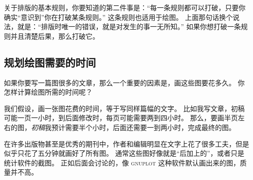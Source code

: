 关于排版的基本规则，你要知道的第二件事是：“每一条规则都可以打破，只要你确实“意识到”你在打破某条规则。”
这条规则也适用于绘图。
上面那句话换个说法，就是：“排版时唯一的错误，就是对发生的事一无所知。”
如果你想打破一条规则并且清楚后果，那么打破它。

\eohs


\subsection{规划绘图需要的时间}

\bohs

如果你要写一篇图很多的文章，那么一个重要的因素是，画这些图要花多久。
你怎样计算绘图所需的时间呢？

我们假设，画一张图花费的时间，等于写同样篇幅的文字。
比如我写文章，初稿可能一页一小时，到后面修改时，每页可能需要两到四小时。
那么，要画半页左右的图，\emph{初稿}我预计需要半个小时，后面还需要一到两小时，完成最终的图。

在许多出版物甚至是优秀的期刊中，作者和编辑明显在文字上花了很多工夫，但是似乎只花了五分钟就画好了所有图。
通常这些图好像就是“后加上的”，或者只是统计软件的截图。
正如后面会讨论的，像 \textsc{gnuplot} 这种软件默认画出来的图，质量并不高。

